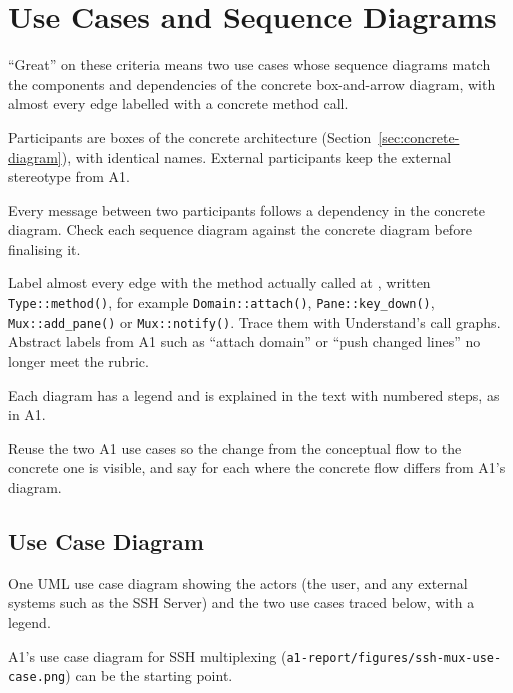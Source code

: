 \section{Use Cases and Sequence Diagrams}
\label{sec:use-cases}


\begin{requirements}
  \item ``Great'' on these criteria means two use cases whose sequence diagrams match the components and dependencies of the concrete box-and-arrow diagram, with almost every edge labelled with a concrete method call.
  \item Participants are boxes of the concrete architecture (Section~\ref{sec:concrete-diagram}), with identical names. External participants keep the \guillemotleft external\guillemotright{} stereotype from A1.
  \item Every message between two participants follows a dependency in the concrete diagram. Check each sequence diagram against the concrete diagram before finalising it.
  \item Label almost every edge with the method actually called at \pinnedcommit, written \texttt{Type::method()}, for example \texttt{Domain::attach()}, \texttt{Pane::key\_down()}, \texttt{Mux::add\_pane()} or \texttt{Mux::notify()}. Trace them with Understand's call graphs. Abstract labels from A1 such as ``attach domain'' or ``push changed lines'' no longer meet the rubric.
  \item Each diagram has a legend and is explained in the text with numbered steps, as in A1.
  \item Reuse the two A1 use cases so the change from the conceptual flow to the concrete one is visible, and say for each where the concrete flow differs from A1's diagram.
\end{requirements}

\subsection{Use Case Diagram}
\label{sec:use-case-diagram}

\begin{requirements}
  \item One UML use case diagram showing the actors (the user, and any external systems such as the SSH Server) and the two use cases traced below, with a legend.
  \item A1's use case diagram for SSH multiplexing (\texttt{a1-report/figures/ssh-mux-use-case.png}) can be the starting point.
\end{requirements}

